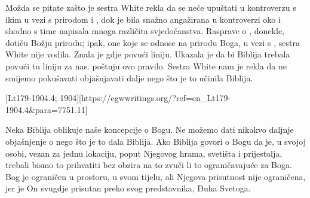 Možda se pitate zašto je sestra White rekla da se neće upuštati u kontroverzu s ikim u vezi s prirodom i , dok je bila snažno angažirana u kontroverzi oko  i shodno s time napisala mnoga različita svjedočanstva. Rasprave o , donekle, dotiču Božju prirodu; ipak, one koje se odnose na prirodu Boga, u vezi s , sestra White nije vodila. Znala je gdje povući liniju. Ukazala je da bi Biblija trebala povući tu liniju za nas.   poštuju ovo pravilo. Sestra White nam je rekla da ne smijemo pokušavati objašnjavati  dalje nego što je to učinila Biblija.

[Lt179-1904.4; 1904][https://egwwritings.org/?ref=en\_Lt179-1904.4&para=7751.11]

Neka Biblija oblikuje naše koncepcije o Bogu. Ne možemo dati nikakvo daljnje objašnjenje o  nego što je to dala Biblija. Ako Biblija govori o Bogu da je, u svojoj osobi, vezan za jednu lokaciju, poput Njegovog hrama, svetišta i prijestolja, trebali bismo to prihvatiti bez obzira na to zvuči li to ograničavajuće za Boga. Bog je ograničen u prostoru, u svom tijelu, ali Njegova prisutnost nije ograničena, jer je On svugdje prisutan preko svog predstavnika, Duha Svetoga.

